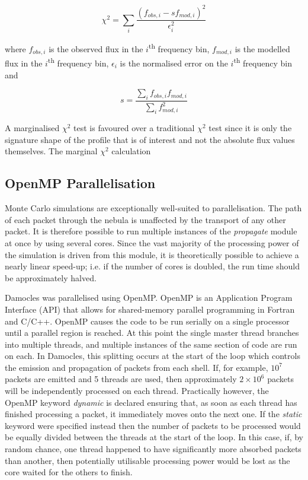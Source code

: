 		\begin{equation}
			\chi^2=\sum_i \frac{(f_{obs,i}-s f_{mod,i})^2}{\epsilon_i^2}
		\end{equation}		
		
		\noindent where $f_{obs,i}$ is the observed flux in the $i$\textsuperscript{th} frequency bin, $f_{mod,i}$ is the modelled flux in the $i$\textsuperscript{th} frequency bin, $\epsilon_i$ is the normalised error on the $i$\textsuperscript{th} frequency bin and 
		
		\begin{equation}
s=\frac{\sum_i f_{obs,i} f_{mod,i}}{\sum_i f_{mod,i}^2}
		\end{equation}		
	
	A marginalised $\chi^2$ test is favoured over a traditional $\chi^2$ test since it is only the signature shape of the profile that is of interest and not the absolute flux values themselves.  The marginal $\chi^2$ calculation %
	
	\subsection{OpenMP Parallelisation}	
	\label{scn:open_mp}
	
	Monte Carlo simulations are exceptionally well-suited to parallelisation.  The path of each packet through the nebula is unaffected by the transport of any other packet.  It is therefore possible to run multiple instances of the \textit{propagate} module at once by using several cores.  Since the vast majority of the processing power of the simulation is driven from this module, it is theoretically possible to achieve a nearly linear speed-up; i.e. if the number of cores is doubled, the run time should be approximately halved.  %
	
	Damocles was parallelised using OpenMP.  OpenMP is an Application Program Interface (API) that allows for shared-memory parallel programming in Fortran and C/C++.  OpenMP causes the code to be run serially on a single processor until a parallel region is reached.  At this point the single master thread branches into multiple threads, and multiple instances of the same section of code are run on each.  In Damocles, this splitting occurs at the start of the loop which controls the emission and propagation of packets from each shell.  If, for example, $10^7$ packets are emitted and 5 threads are used, then approximately $2 \times 10^6$ packets will be independently processed on each thread.  Practically however, the OpenMP keyword \textit{dynamic} is declared ensuring that, as soon as each thread has finished processing a packet, it immediately moves onto the next one.  If the \textit{static} keyword were specified instead then the number of packets to be processed would be equally divided between the threads at the start of the loop.  In this case, if, by random chance, one thread happened to have significantly more absorbed packets than another, then potentially utilisable processing power would be lost as the core waited for the others to finish.
	
